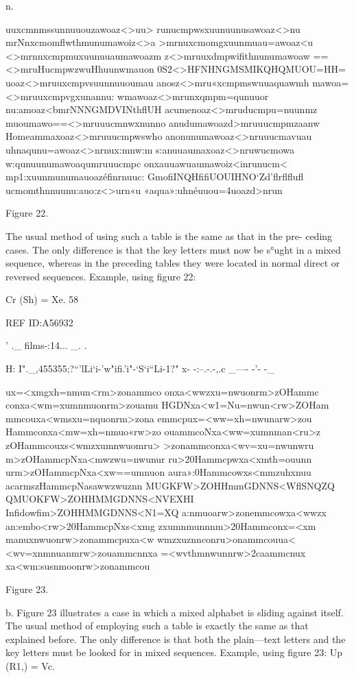 {n.

uuxcmnmssunnuuouzawoaz<>uu>
runucmpwsxuunuunusawoaz<>nu
mrNnxcmomﬂwthmunumawoiz<>a
>mrnuxcmomgxuunmuau=awoaz<u
<>mrnnxcmpmuxuunuuaumawoazm
z<>mruuxdmpwiﬁthnunumawoaw
==<>mruHucmpwzwuHhuunwmauon
0S2<>HFNHNGMSMIKQHQMUOU=HH=
uoaz<>mruuxcmpvsuunnuuoumau
anosz<>mru«xcmpmswuuaquawmh
mawoa=<>mruuxcmpvgxunannu:
wmawoaz<>mrunxqmpm=qunuuor
nu:amoaz<bmrNNNGMDVINthﬂUH
acumenoaz<>mruducmpu=nuunmz
muoumawo==<>mruuucmnwxnunno
anudumawoazd>mruuucmpmzaanw
Homeammaxoaz<>mruuucmpwswho
anonunumawoaz<>nruuucmavuau
uhnaqunu=awoaz<>nrnux:mnw:m
s:anuuaumaxoaz<>nruwucmowa
w:qunuunumawoaqumruuucmpc
onxauuawuaumawoiz<inrunucm<
mp1:xuunmunumauoazéﬁnrnuuc:
GmoﬁINQHﬁﬁUOUIHNO‘Zd’ﬂrﬂﬂuﬂ
ucmomthnnuunu:auo:z<>urn«u
«aqua»:uhnéuuou=4uoazd>nrun

Figure 22.

The usual method of using such a table is the same as that in the pre-
ceding cases. The only difference is that the key letters must now be
s°ught in a mixed sequence, whereas in the preceding tables they were
located in normal direct or reversed sequences. Example, using ﬁgure 22:

Cr (Sh) = Xe.
58

 

 

 

REF ID:A56932

 

' ._ ﬁlms-:14... _. .

H: I"._,455355;?“'lLi‘i-'w"ifi.'i"-‘S‘i“Li-1?" x- -:--.-.-,.c _---- -'- -_

ux=<xmgxh=nmun<rm>zonammco
onxa<wwzxu=nwuonrm>zOHammc
conxa<wm=xumnmuonrm>zouamu
HGDNxa<w1=Nu=nwun<rw>ZOHam
mmcouxa<wmsxu=nquonrm>zona
emmcpux=<ww=xh=nwunarw>zou
Hammconxa<mw=xh=nmuo«rw>zo
ouammcoNxa<ww=xumnman<ru>z
zOHammcouxs<wmzxumnwuomru>
>zonammconxa<wv=xu=nwunwru
m>zOHammcpNxa<mwzwu=nwunur
ru>20Hammcpwxa<xmth=ouunn
urm>zOHammcpNxa<xw==umnuon
aura»:0Hammcowxs<mmzuhxnuu
acarmszHammcpNasawwzwuznn
MUGKFW>ZOHHmmGDNNS<WﬂSNQZQ
QMUOKFW>ZOHHMMGDNNS<NVEXHI
Inﬁdowﬁm>ZOHHMMGDNNS<N1=XQ
a:nmuoarw>zonemmcowxa<wwzx
an:embo<rw>20HammcpNxs<xmg
zxumnmunnnm>20Hammconx=<xm
manuxnwuonrw>zonammcpuxa<w
wmzxuznnconru>onammcouua<
<wv=xnmnuanmrw>zouammcnnxa
=<wvthmnwunnrw>2caammcnux
xa<wm:susnmoonrw>zonammcou

Figure 23.

b. Figure 23 illustrates a case in which a mixed alphabet is sliding
against itself. The usual method of employing such a table is exactly
the same as that explained before. The only difference is that both the
plain—text letters and the key letters must be looked for in mixed
sequences. Example, using ﬁgure 23: Up (R1,) = Vc.

}
